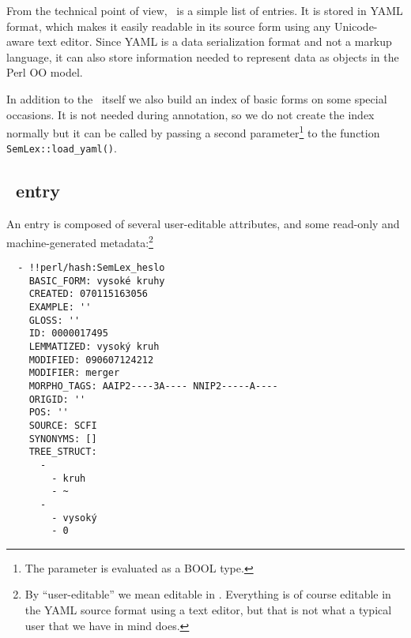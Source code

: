 From the technical point of view, \semlex\ is a simple list of entries. It is stored in YAML format, which makes it easily readable in its source form using any Unicode-aware text editor. Since YAML is a data serialization format and not a markup language, it can also store information needed to represent data as objects in the Perl OO model. 

In addition to the \semlex\ itself we also build an index of basic forms on some special occasions. It is not needed during annotation, so we do not create the index normally but it can be called by passing a second parameter\footnote{The parameter is evaluated as a BOOL type.} to the function \verb=SemLex::load_yaml()=. 

\subsection{\semlex\ entry}
\label{sec:semlex:entry}
An entry is composed of several user-editable attributes, and some read-only and machine-generated metadata:\footnote{By ``user-editable'' we mean editable in \seman. Everything is of course editable in the YAML source format using a text editor, but that is not what a typical user that we have in mind does.} 
\begin{verbatim}
  - !!perl/hash:SemLex_heslo 
    BASIC_FORM: vysoké kruhy
    CREATED: 070115163056
    EXAMPLE: ''
    GLOSS: ''
    ID: 0000017495
    LEMMATIZED: vysoký kruh
    MODIFIED: 090607124212
    MODIFIER: merger
    MORPHO_TAGS: AAIP2----3A---- NNIP2-----A----
    ORIGID: ''
    POS: ''
    SOURCE: SCFI
    SYNONYMS: []
    TREE_STRUCT: 
      - 
        - kruh
        - ~
      - 
        - vysoký
        - 0
\end{verbatim}

